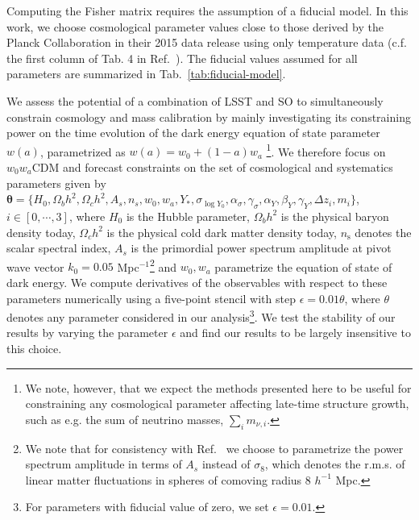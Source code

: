\documentclass[%
 reprint,
nofootinbib,
 amsmath,amssymb,
 aps,
]{revtex4-1}
\begin{document}
Computing the Fisher matrix requires the assumption of a fiducial model. In this work, we choose cosmological parameter values close to those derived by the Planck Collaboration in their 2015 data release using only temperature data \cite{Planck:2016} (c.f. the first column of Tab. 4 in Ref.~\cite{Planck:2016}). The fiducial values assumed for all parameters are summarized in Tab.~\ref{tab:fiducial-model}.

We assess the potential of a combination of LSST and SO to simultaneously constrain cosmology and mass calibration by mainly investigating its constraining power on the time evolution of the dark energy equation of state parameter $w(a)$, parametrized as $w(a) = w_{0} + (1 - a)w_{a}$ \cite{Chevallier:2001, Linder:2003}\footnote{We note, however, that we expect the methods presented here to be useful for constraining any cosmological parameter affecting late-time structure growth, such as e.g. the sum of neutrino masses, $\sum_{i} m_{\nu, i}$.}. We therefore focus on $w_{0}w_{a}$CDM and forecast constraints on the set of cosmological and systematics parameters given by $\boldsymbol{\theta} = \{H_{0}, \allowbreak \Omega_{b}h^{2}, \allowbreak \Omega_{c}h^{2}, \allowbreak A_{s}, \allowbreak n_{s}, \allowbreak w_{0}, \allowbreak w_{a}, \allowbreak Y_{*}, \allowbreak \sigma_{\log{Y_{0}}}, \allowbreak \alpha_{\sigma}, \allowbreak \gamma_{\sigma}, \allowbreak \alpha_{Y}, \allowbreak \beta_{Y}, \allowbreak \gamma_{Y}, \allowbreak \Delta z_{i}, \allowbreak m_{i} \}$, $i \in [0, \cdots, 3]$, where $H_{0}$ is the Hubble parameter, $\Omega_{b}h^{2}$ is the physical baryon density today, $\Omega_{c}h^{2}$ is the physical cold dark matter density today, $n_{\mathrm{s}}$ denotes the scalar spectral index, $A_{s}$ is the primordial power spectrum amplitude at pivot wave vector $k_{0}=0.05$ Mpc$^{-1}$\footnote{We note that for consistency with Ref.~\cite{Madhavacheril:2017} we choose to parametrize the power spectrum amplitude in terms of $A_{s}$ instead of $\sigma_{8}$, which denotes the r.m.s. of linear matter fluctuations in spheres of comoving radius 8 $h^{-1}$ Mpc.} and $w_{0}, w_{a}$ parametrize the equation of state of dark energy. We compute derivatives of the observables with respect to these parameters numerically using a five-point stencil with step $\epsilon = 0.01\theta$, where $\theta$ denotes any parameter considered in our analysis\footnote{For parameters with fiducial value of zero, we set  $\epsilon = 0.01$.}. We test the stability of our results by varying the parameter $\epsilon$ and find our results to be largely insensitive to this choice. 
\end{document}
